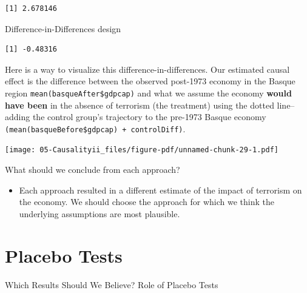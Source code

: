 \documentclass[
  letterpaper,
  DIV=11,
  numbers=noendperiod]{scrreprt}
\newenvironment{Shaded}{\begin{snugshade}}{\end{snugshade}}
\newcommand{\FunctionTok}[1]{\textcolor[rgb]{0.28,0.35,0.67}{#1}}
\newcommand{\NormalTok}[1]{\textcolor[rgb]{0.00,0.23,0.31}{#1}}
\newcommand{\OtherTok}[1]{\textcolor[rgb]{0.00,0.23,0.31}{#1}}
\newcommand{\SpecialCharTok}[1]{\textcolor[rgb]{0.37,0.37,0.37}{#1}}
\providecommand{\tightlist}{%
  \setlength{\itemsep}{0pt}\setlength{\parskip}{0pt}}\usepackage{longtable,booktabs,array}
\begin{document}
\begin{verbatim}
[1] 2.678146
\end{verbatim}

Difference-in-Differences design

\begin{Shaded}
\end{Shaded}

\begin{verbatim}
[1] -0.48316
\end{verbatim}

Here is a way to visualize this difference-in-differences. Our estimated
causal effect is the difference between the observed post-1973 economy
in the Basque region \texttt{mean(basqueAfter\$gdpcap)} and what we
assume the economy \textbf{would have been} in the absence of terrorism
(the treatment) using the dotted line-- adding the control group's
trajectory to the pre-1973 Basque economy
\texttt{(mean(basqueBefore\$gdpcap)\ +\ controlDiff)}.

\texttt{[image: 05-Causalityii\_files/figure-pdf/unnamed-chunk-29-1.pdf]}

What should we conclude from each approach?

\begin{itemize}
\tightlist
\item
  Each approach resulted in a different estimate of the impact of
  terrorism on the economy. We should choose the approach for which we
  think the underlying assumptions are most plausible.
\end{itemize}

\hypertarget{placebo-tests}{%
\section{Placebo Tests}\label{placebo-tests}}

Which Results Should We Believe? Role of Placebo Tests
\end{document}
